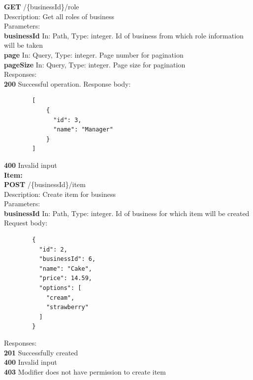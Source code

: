 \documentclass[11pt,a4paper,pdftex]{article}
\begin{document}
\hspace*{1em}\textbf{GET} /\{businessId\}/role\\
\hspace*{2em}Description: Get all roles of business\\
\hspace*{2em}Parameters:\\
\hspace*{3em}\textbf{businessId} In: Path, Type: integer. Id of business from which role information will be taken\\
\hspace*{3em}\textbf{page} In: Query, Type: integer. Page number for pagination\\
\hspace*{3em}\textbf{pageSize} In: Query, Type: integer. Page size for pagination\\
\hspace*{2em}Responses:\\
\hspace*{3em}\textbf{200} Successful operation. Response body:
\begin{verbatim}
        [
            {
              "id": 3,
              "name": "Manager"
            }
        ]
\end{verbatim}
\hspace*{3em}\textbf{400} Invalid input\\

\textbf{Item:}\\
\hspace*{1em}\textbf{POST} /\{businessId\}/item\\
\hspace*{2em}Description: Create item for business\\
\hspace*{2em}Parameters:\\
\hspace*{3em}\textbf{businessId} In: Path, Type: integer. Id of business for which item will be created\\
\hspace*{2em}Request body:
\begin{verbatim}
        {
          "id": 2,
          "businessId": 6,
          "name": "Cake",
          "price": 14.59,
          "options": [
            "cream",
            "strawberry"
          ]
        }
\end{verbatim}
\hspace*{2em}Responses:\\
\hspace*{3em}\textbf{201} Successfully created\\
\hspace*{3em}\textbf{400} Invalid input\\
\hspace*{3em}\textbf{403} Modifier does not have permission to create item
\end{document}
